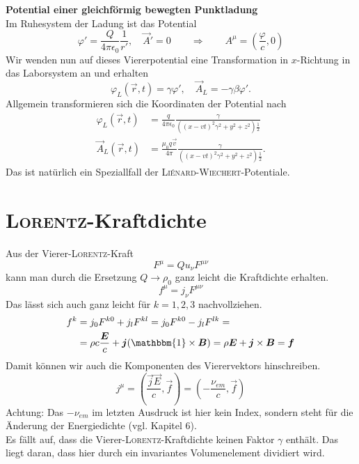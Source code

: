 \textbf{Potential einer gleichförmig bewegten Punktladung}\\

Im Ruhesystem der Ladung ist das Potential
\begin{equation*}
\varphi' = \frac{Q}{4\pi\epsilon_0}\frac{1}{r'},\quad\vec{A}' = 0 \qquad\Rightarrow\qquad A^\mu=\left(\frac{\varphi}{c},0\right)
\end{equation*}
Wir wenden nun auf dieses Viererpotential eine Transformation in $x$-Richtung in das Laborsystem an und erhalten
\begin{equation*}
\varphi_L(\vec{r},t) = \gamma\varphi',\quad\vec{A}_L = -\gamma\beta\varphi'.
\end{equation*}
Allgemein transformieren sich die Koordinaten der Potential nach
\begin{align*}
\varphi_L(\vec{r},t) &=\frac{q}{4\pi\epsilon_0}\frac{\gamma}{\left((x-vt)^2\gamma^2 + y^2+z^2\right)\frac{1}{2}}\\
\vec{A}_L(\vec{r},t) &=\frac{\mu_0q\vec{v}}{4\pi}\frac{\gamma}{\left((x-vt)^2\gamma^2 + y^2+z^2\right)\frac{1}{2}}.
\end{align*}
Das ist natürlich ein Speziallfall der \textsc{Liénard-Wiechert}-Potentiale.

\section{\textsc{Lorentz}-Kraftdichte}

Aus der Vierer-\textsc{Lorentz}-Kraft 
\begin{equation*}
F^\mu = Qu_\nu F^{\mu\nu}
\end{equation*}
kann man durch die Ersetzung $Q\rightarrow\rho_0$ ganz leicht die Kraftdichte erhalten.
\begin{equation*}
f^\mu = j_\nu F^{\mu\nu}
\end{equation*}
Das lässt sich auch ganz leicht für $k=1,2,3$ nachvollziehen.
\begin{align*}
f^k &= j_0F^{k0} + j_l F^{kl} = j_0 F^{k0}-j_l F^{lk} = \\
&=\rho c\frac{\vec{E}}{c} + \vec{j}(\mathbbm{1}\times\vec{B})=\rho\vec{E}+\vec{j}\times\vec{B} = \vec{f}
\end{align*}
Damit können wir auch die Komponenten des Vierervektors hinschreiben.
\begin{equation*}
j^\mu = \left(\frac{\vec{j}\vec{E}}{c},\vec{f}\right) = \left(-\frac{\nu_\textit{em}}{c},\vec{f}\right)
\end{equation*}
Achtung: Das $-\nu_\textit{em}$ im letzten Ausdruck ist hier kein Index, sondern steht für die Änderung der Energiedichte (vgl. Kapitel 6).\\
Es fällt auf, dass die Vierer-\textsc{Lorentz}-Kraftdichte keinen Faktor $\gamma$ enthält. Das liegt daran, dass hier durch ein invariantes Volumenelement dividiert wird.

